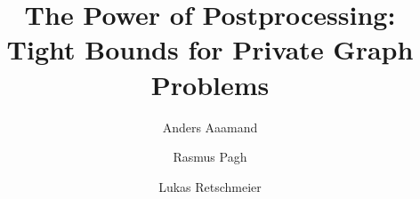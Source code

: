 \documentclass[a4paper,UKenglish,thm-restate]{templates/lipics-v2021}
\title{The Power of Postprocessing: Tight Bounds for Private Graph Problems}
\author{Anders Aaamand}{BARC, University of Copenhagen, Denmark}{andersaamanda@gmail.com}{https://orcid.org/0000-0003-2805-9939}{}
\author{Rasmus Pagh}{BARC, University of Copenhagen, Denmark}{pagh@di.ku.dk}{https://orcid.org/0000-0003-2805-9939}{}
\author{Lukas Retschmeier}{BARC, University of Copenhagen, Denmark}{lure@di.ku.dk}{https://orcid.org/0000-0003-2805-9939}{}
\begin{document}
\maketitle





% 

%

\nocite{*}




\appendix
\newpage

\end{document}
